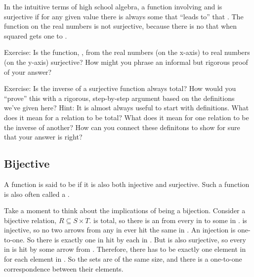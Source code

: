 \documentclass[letterpaper,10pt,english]{sphinxmanual}
\begin{document}
In the intuitive terms of high school algebra, a function involving
 and  is surjective if for any given  value there is always
some  that “leads to” that . The  function on the real
numbers is not surjective, because there is no  that when squared
gets one to .

Exercise: Is the function, , from the real numbers (on
the x-axis) to real numbers (on the y-axis) surjective? How might you
phrase an informal but rigorous proof of your answer?

Exercise: Is the inverse of a surjective function always total? How
would you “prove” this with a rigorous, step-by-step argument based on
the definitions we’ve given here? Hint: It is almost always useful to
start with definitions. What does it mean for a relation to be total?
What does it mean for one relation to be the inverse of another? How
can you connect these definitons to show for sure that your answer is
right?


\subsection{Bijective}
\label{\detokenize{07-set-theory:bijective}}
A function is said to be  if it is also both injective and
surjective. Such a function is also often called a .

Take a moment to think about the implications of being a bijection.
Consider a bijective relation, \(R \subseteq S \times T.\)  is
total, so there is an  from every  in  to some  in
.   is injective, so no two arrows from any  in  ever hit
the same  in . An injection is one-to-one. So there is exactly
one  in  hit by each  in . But  is also surjective, so
every  in  is hit by some arrow from . Therefore, there has
to be exactly one element in  for each element in . So the sets
are of the same size, and there is a one-to-one correspondence between
their elements.
\end{document}
